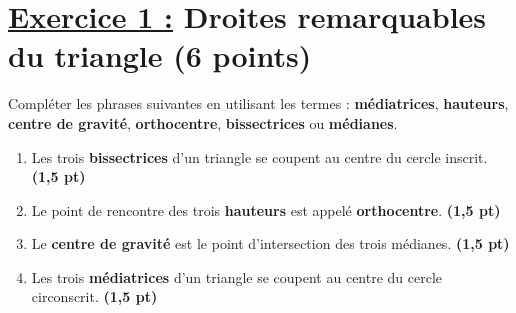 \documentclass[12pt,a4paper]{article}
\begin{document}
\renewcommand{\arraystretch}{1.5}
\renewcommand{\arrayrulewidth}{1.2pt}
\vspace{3cm}

\section*{\underline{Exercice 1 :} Droites remarquables du triangle (6 points)}

Compléter les phrases suivantes en utilisant les termes : \textbf{médiatrices}, \textbf{hauteurs}, \textbf{centre de gravité}, \textbf{orthocentre}, \textbf{bissectrices} ou \textbf{médianes}.

\begin{enumerate}
    \item Les trois \textbf{bissectrices} d'un triangle se coupent au centre du cercle inscrit. \hfill \textbf{(1,5 pt)}
    \item Le point de rencontre des trois \textbf{hauteurs} est appelé \textbf{orthocentre}. \hfill \textbf{(1,5 pt)}
    \item Le \textbf{centre de gravité} est le point d'intersection des trois médianes. \hfill \textbf{(1,5 pt)}
    \item Les trois \textbf{médiatrices} d'un triangle se coupent au centre du cercle circonscrit. \hfill \textbf{(1,5 pt)}
\end{enumerate}
\end{document}
